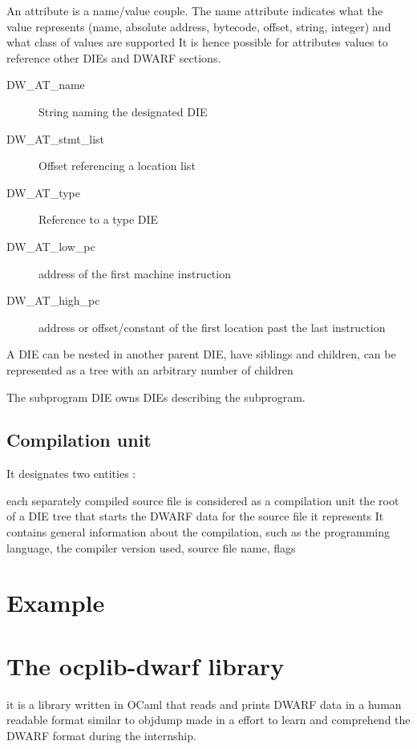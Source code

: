 An attribute is a name/value couple.
The name attribute indicates what the value represents (name, absolute address,
bytecode, offset, string, integer) and what class of values are supported
It is hence possible for attributes values to reference other DIEs and DWARF sections.

\begin{description}
    \item[DW\_AT\_name] String naming the designated DIE
    \item[DW\_AT\_stmt\_list] Offset referencing a location list
    \item[DW\_AT\_type] Reference to a type DIE
    \item[DW\_AT\_low\_pc] address of the first machine instruction
    \item[DW\_AT\_high\_pc] address or offset/constant of the first location past the last instruction
\end{description}

A DIE can be nested in another parent DIE, have siblings and children,
can be represented as a tree with an arbitrary number of children

The subprogram DIE owns DIEs describing the subprogram.

\subsection{Compilation unit}

It designates two entities :

each separately compiled source file is considered as a compilation unit
the root of a DIE tree that starts the DWARF data for the source file it represents
It contains general information about the compilation,
such as the programming language, the compiler version used, source file name, flags

\section{Example}

\section{The ocplib-dwarf library}

it is a library written in OCaml that reads and prints DWARF data in a human readable format similar to objdump
made in a effort to learn and comprehend the DWARF format during the internship.

